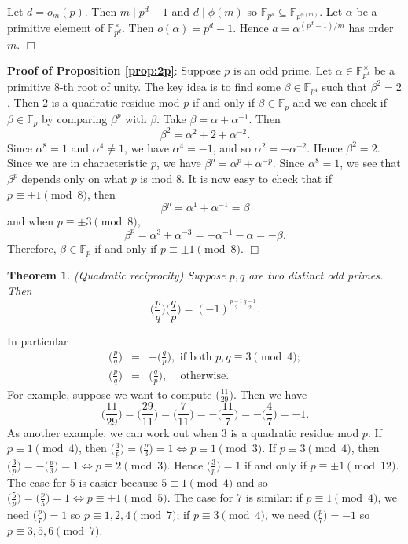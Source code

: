 \documentclass{article}
\def\F{{\mathbb F}}
\def\F{{\mathbb F}}
\newtheorem{theorem}[subsection]{Theorem}
\newenvironment{proof}{\noindent {\bf Proof:}}{$\Box$ \vspace{2 ex}}
\renewcommand{\lg}[2]{\Big(\frac{#1}{#2}\Big)}
\begin{document}
\begin{proof}
    Let $d = o_m(p)$. Then $m\mid p^d - 1$ and $d\mid \phi(m)$ so $\F_{p^d}\subseteq\F_{p^{\phi(m)}}.$ Let $\alpha$ be a primitive element of $\F_{p^d}^\times$. Then $o(\alpha) = p^{d} - 1$. Hence $a = \alpha^{(p^{d}-1)/m}$ has order $m$.
\end{proof}

\noindent\textbf{Proof of Proposition \ref{prop:2p}}: Suppose $p$ is an odd prime. Let $\alpha\in\F_{p^4}^\times$ be a primitive $8$-th root of unity. The key idea is to find some $\beta\in\F_{p^4}$ such that $\beta^2 = 2$. Then $2$ is a quadratic residue mod $p$ if and only if $\beta\in\F_p$ and we can check if $\beta\in\F_p$ by comparing $\beta^p$ with $\beta.$ Take $\beta = \alpha + \alpha^{-1}$. Then
$$\beta^2 = \alpha^2 + 2 + \alpha^{-2}.$$ Since $\alpha^8 = 1$ and $\alpha^4\neq 1$, we have $\alpha^4 = -1$, and so $\alpha^2 = -\alpha^{-2}$. Hence $\beta^2 = 2$.
Since we are in characteristic $p$, we have $\beta^p = \alpha^p + \alpha^{-p}$. Since $\alpha^8 = 1$, we see that $\beta^p$ depends only on what $p$ is mod $8$. It is now easy to check that if $p\equiv \pm1\pmod{8}$, then
$$\beta^p = \alpha^1 + \alpha^{-1} = \beta$$
and when $p\equiv \pm3\pmod{8}$, 
$$\beta^p = \alpha^3 + \alpha^{-3} = -\alpha^{-1} - \alpha = -\beta.$$
Therefore, $\beta\in\F_p$ if and only if $p\equiv \pm 1\pmod{8}$. \hspace{20pt} $\Box$



\begin{theorem}
    (Quadratic reciprocity) Suppose $p,q$ are two distinct odd primes. Then
    $$\lg{p}{q}\lg{q}{p} = (-1)^{\frac{p-1}{2}\frac{q-1}{2}}.$$
\end{theorem}
In particular
\begin{eqnarray*}
 \lg{p}{q} &=& -\lg{q}{p},\mbox{ if both }p,q\equiv3\pmod{4};\\
 \lg{p}{q} &=& \lg{q}{p},\,\,\,\,\,\mbox{ otherwise}.
\end{eqnarray*}
For example, suppose we want to compute $\displaystyle\lg{11}{29}$. Then we have
$$\lg{11}{29} = \lg{29}{11} = \lg{7}{11} = -\lg{11}{7} = -\lg{4}{7}=-1.$$
As another example, we can work out when $3$ is a quadratic residue mod $p$. If $p\equiv 1\pmod{4}$, then $\lg{3}{p} = \lg{p}{3} = 1 \Leftrightarrow p\equiv 1\pmod{3}.$ If $p\equiv 3\pmod{4}$, then $\lg{3}{p} = -\lg{p}{3} = 1 \Leftrightarrow p\equiv 2\pmod{3}.$ Hence $\lg{3}{p} = 1$ if and only if $p\equiv \pm1\pmod{12}$. The case for $5$ is easier because $5\equiv 1\pmod{4}$ and so $\lg{5}{p} = \lg{p}{5} = 1 \Leftrightarrow p\equiv \pm 1\pmod{5}$. The case for $7$ is similar: if $p\equiv 1\pmod{4}$, we need $\lg{p}{7}=1$ so $p\equiv 1,2,4\pmod{7}$; if $p\equiv 3\pmod{4}$, we need $\lg{p}{7}=-1$ so $p\equiv 3,5,6\pmod{7}$.
\end{document}
